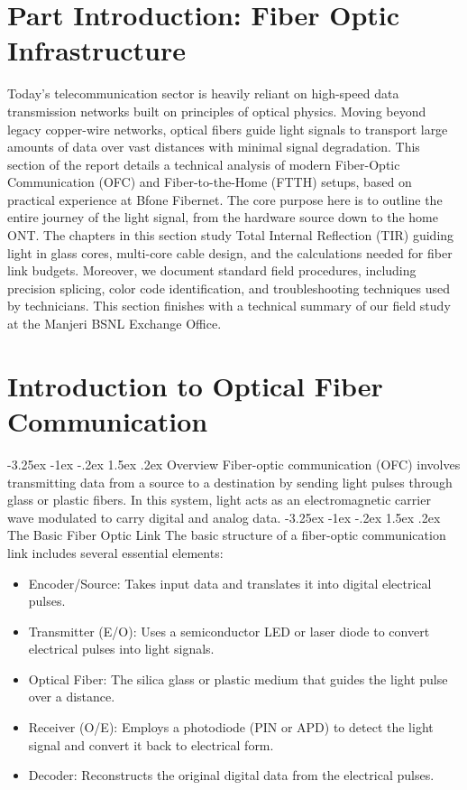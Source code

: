\documentclass[11pt,a4paper]{report}
\makeatletter
\renewcommand{\section}{\@startsection{section}{1}{\z@}%
  {-3.25ex \@plus -1ex \@minus -.2ex}%
  {1.5ex \@plus.2ex}%
  {\normalfont\Large\bfseries\color{primaryColor}}}
\makeatother
\begin{document}
\chapter*{Part Introduction: Fiber Optic Infrastructure}
Today's telecommunication sector is heavily reliant on high-speed data transmission networks built on principles of optical physics. Moving beyond legacy copper-wire networks, optical fibers guide light signals to transport large amounts of data over vast distances with minimal signal degradation. This section of the report details a technical analysis of modern Fiber-Optic Communication (OFC) and Fiber-to-the-Home (FTTH) setups, based on practical experience at Bfone Fibernet. The core purpose here is to outline the entire journey of the light signal, from the hardware source down to the home ONT. The chapters in this section study Total Internal Reflection (TIR) guiding light in glass cores, multi-core cable design, and the calculations needed for fiber link budgets. Moreover, we document standard field procedures, including precision splicing, color code identification, and troubleshooting techniques used by technicians. This section finishes with a technical summary of our field study at the Manjeri BSNL Exchange Office.
\chapter{Introduction to Optical Fiber Communication}
\section{Overview}
Fiber-optic communication (OFC) involves transmitting data from a source to a destination by sending light pulses through glass or plastic fibers. In this system, light acts as an electromagnetic carrier wave modulated to carry digital and analog data.
\section{The Basic Fiber Optic Link}
The basic structure of a fiber-optic communication link includes several essential elements:
\begin{itemize}
  \item Encoder/Source: Takes input data and translates it into digital electrical pulses.
  \item Transmitter (E/O): Uses a semiconductor LED or laser diode to convert electrical pulses into light signals.
  \item Optical Fiber: The silica glass or plastic medium that guides the light pulse over a distance.
  \item Receiver (O/E): Employs a photodiode (PIN or APD) to detect the light signal and convert it back to electrical form.
  \item Decoder: Reconstructs the original digital data from the electrical pulses.
\end{itemize}
\end{document}
